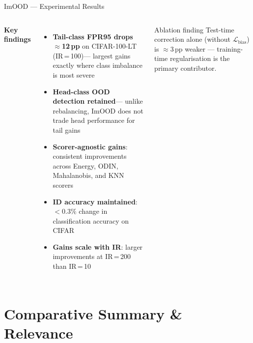 \documentclass[aspectratio=169,10pt]{beamer}
\begin{document}
\begin{frame}{ImOOD --- Experimental Results}
\begin{columns}[T]
      \textbf{Key findings}
      \begin{itemize}
        \item \textbf{Tail-class FPR95 drops $\approx$12\,pp}
              on CIFAR-100-LT (IR\,=\,100)---
              largest gains exactly where class imbalance is most severe
        \item \textbf{Head-class OOD detection retained}---
              unlike rebalancing, ImOOD does not trade head
              performance for tail gains
        \item \textbf{Scorer-agnostic gains}:
              consistent improvements across Energy, ODIN, Mahalanobis,
              and KNN scorers
        \item \textbf{ID accuracy maintained}:
              $< 0.3\%$ change in classification accuracy on CIFAR
        \item \textbf{Gains scale with IR}:
              larger improvements at IR\,=\,200 than IR\,=\,10
      \end{itemize}
      \vspace{4pt}
      \begin{alertblock}{Ablation finding}
        Test-time correction alone (without $\mathcal{L}_{\text{bias}}$)
        is $\approx\!3$\,pp weaker --- training-time regularisation
        is the primary contributor.
      \end{alertblock}
  \end{columns}
\end{frame}

\section{Comparative Summary \& Relevance}
\end{document}
